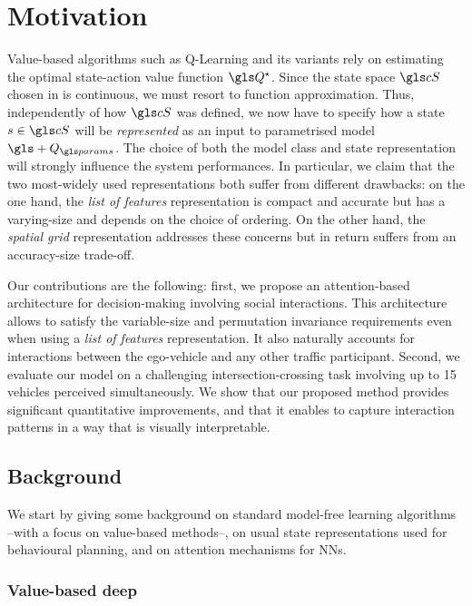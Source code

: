 \section{Motivation}

Value-based  algorithms such as Q-Learning \citep{Watkins1992} and its variants rely on estimating the optimal state-action value function $\Q^\star$. Since the state space $\cS$ chosen in  is continuous, we must resort to function approximation. Thus, independently of how $\cS$ was defined, we now have to specify how a state $s\in\cS$ will be \textit{represented} as an input to parametrised model $\gls+{Q}_\params$. The choice of both the model class and state representation will strongly influence the system performances. In particular, we claim that the two most-widely used representations both suffer from different drawbacks: on the one hand, the \emph{list of features} representation is compact and accurate but has a varying-size and depends on the choice of ordering. On the other hand, the \emph{spatial grid} representation addresses these concerns but in return suffers from an accuracy-size trade-off.

Our contributions are the following: first, we propose an attention-based architecture for decision-making involving social interactions. This architecture allows to satisfy the variable-size and permutation invariance requirements even when using a \emph{list of features} representation. It also naturally accounts for interactions between the ego-vehicle and any other traffic participant.
Second, we evaluate our model on a challenging intersection-crossing task involving up to 15 vehicles perceived simultaneously. We show that our proposed method provides significant quantitative improvements, and that it enables to capture interaction patterns in a way that is visually interpretable.

\subsection{Background}

\label{sec:background}

We start by giving some background on standard model-free learning algorithms --with a focus on value-based methods--, on usual state representations used for behavioural planning, and on attention mechanisms for \glspl{NN}.

\subsubsection{Value-based deep }

